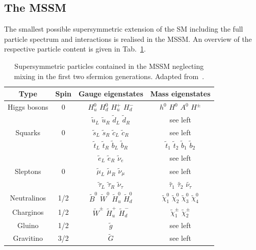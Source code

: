 \subsection{The MSSM}
\label{subsec:mssm}
The smallest possible supersymmetric extension of the SM including the full particle spectrum and interactions is realised in the MSSM. An overview of the respective particle content is given in Tab.~\ref{tab:mssm_particles}. 
\begin{table}[htbp] 
  \centering
  \label{tab:mssm_particles}
    \begin{tabular}{cccc}
      \toprule
      Type & Spin & Gauge eigenstates & Mass eigenstates \\
      \midrule
      \midrule
      Higgs bosons & 0 & $H_{u}^{0}$ $H_{d}^{0}$ $H_{u}^{+}$ $H_{d}^{-}$ & $h^{0}$ $H^{0}$ $A^{0}$ $H^{\pm}$  \\
      \midrule
      & & $\tilde{u}_{L}$ $\tilde{u}_{R}$ $\tilde{d}_{L}$ $\tilde{d}_{R}$ &  see left \\
      Squarks & 0 & $\tilde{s}_{L}$ $\tilde{s}_{R}$ $\tilde{c}_{L}$ $\tilde{c}_{R}$  & see left \\
      & & $\tilde{t}_{L}$ $\tilde{t}_{R}$ $\tilde{b}_{L}$ $\tilde{b}_{R}$ & $\tilde{t}_{1}$ $\tilde{t}_{2}$ $\tilde{b}_{1}$ $\tilde{b}_{2}$ \\
      \midrule
      & & $\tilde{e}_{L}$ $\tilde{e}_{R}$ $\tilde{\nu}_{e}$ &  see left \\
      Sleptons  & 0 & $\tilde{\mu}_{L}$ $\tilde{\mu}_{R}$ $\tilde{\nu}_{\mu}$ & see left \\
      & & $\tilde{\tau}_{L}$ $\tilde{\tau}_{R}$ $\tilde{\nu}_{\tau}$ & $\tilde{\tau_{1}}$ $\tilde{\tau_{2}}$ $\tilde{\nu_{\tau}}$ \\
      \midrule
      Neutralinos  & 1/2 & $\tilde{B}^{0}$ $\tilde{W}^{0}$ $\tilde{H}_{u}^{0}$ $\tilde{H}_{d}^{0}$ & $\tilde{\chi}_{1}^{0}$ $\tilde{\chi}_{2}^{0}$ $\tilde{\chi}_{3}^{0}$ $\tilde{\chi}_{4}^{0}$ \\
      \midrule
      Charginos & 1/2 & $\tilde{W}^{\pm}$ $\tilde{H}_{u}^{+}$ $\tilde{H}_{d}^{-}$ & $\tilde{\chi}_{1}^{\pm}$ $\tilde{\chi}_{2}^{\pm}$ \\
      \midrule
      Gluino & 1/2 & $\tilde{g}$ & see left \\
      \midrule
      Gravitino & 3/2 & $\tilde{G}$ & see left \\
      \bottomrule
    \end{tabular}%
 \caption{Supersymmetric particles contained in the MSSM neglecting mixing in the first two sfermion generations. Adapted from~\cite{Martin:1997ns}.} 
\end{table}
